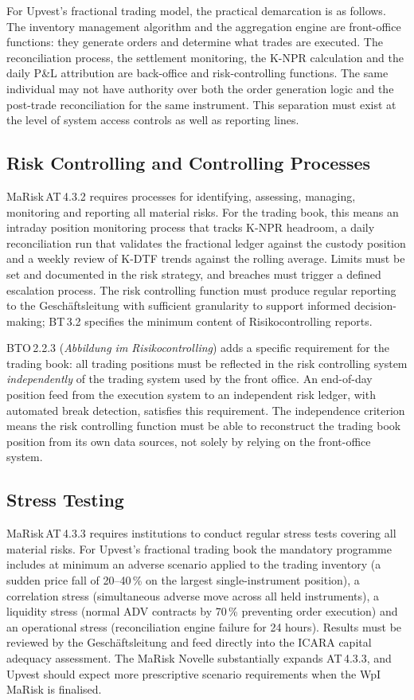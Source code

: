 \documentclass[12pt,a4paper]{report}
\begin{document}
For Upvest's fractional trading model, the practical demarcation is as follows.
The inventory management algorithm and the aggregation engine are front-office
functions: they generate orders and determine what trades are executed. The
reconciliation process, the settlement monitoring, the K-NPR calculation and the
daily P\&L attribution are back-office and risk-controlling functions. The same
individual may not have authority over both the order generation logic and the
post-trade reconciliation for the same instrument. This separation must exist at
the level of system access controls as well as reporting lines.

\subsection{Risk Controlling and Controlling Processes}

MaRisk\,AT\,4.3.2 requires processes for identifying, assessing, managing,
monitoring and reporting all material risks. For the trading book, this means
an intraday position monitoring process that tracks K-NPR headroom, a daily
reconciliation run that validates the fractional ledger against the custody
position and a weekly review of K-DTF trends against the rolling average. Limits
must be set and documented in the risk strategy, and breaches must trigger a
defined escalation process. The risk controlling function must produce regular
reporting to the Gesch{\"a}ftsleitung with sufficient granularity to support
informed decision-making; BT\,3.2 specifies the minimum content of
Risikocontrolling reports.

BTO\,2.2.3 (\textit{Abbildung im Risikocontrolling}) adds a specific requirement
for the trading book: all trading positions must be reflected in the risk
controlling system \textit{independently} of the trading system used by the
front office. An end-of-day position feed from the execution system to an
independent risk ledger, with automated break detection, satisfies this
requirement. The independence criterion means the risk controlling function must
be able to reconstruct the trading book position from its own data sources, not
solely by relying on the front-office system.

\subsection{Stress Testing}

MaRisk\,AT\,4.3.3 requires institutions to conduct regular stress tests covering
all material risks. For Upvest's fractional trading book the mandatory programme
includes at minimum an adverse scenario applied to the trading inventory (a
sudden price fall of 20--40\,\% on the largest single-instrument position), a
correlation stress (simultaneous adverse move across all held instruments), a
liquidity stress (normal ADV contracts by 70\,\% preventing order execution) and
an operational stress (reconciliation engine failure for 24 hours). Results must
be reviewed by the Gesch{\"a}ftsleitung and feed directly into the ICARA capital
adequacy assessment. The MaRisk Novelle substantially expands
AT\,4.3.3, and Upvest should expect more prescriptive scenario requirements
when the WpI\,MaRisk is finalised.
\end{document}
